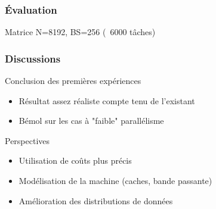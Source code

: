 \documentclass[xcolor={usenames,dvipsnames,svgnames,table}, aspectratio=43]{beamer}
\begin{document}
\begin{frame}
  \frametitle{Évaluation}
  Matrice N=8192, BS=256 (~6000 tâches)
  \begin{figure}
  \end{figure}


\end{frame}


\begin{frame}
  \frametitle{Discussions}

  \begin{block}{Conclusion des premières expériences}
    \begin{itemize}
      \item Résultat assez réaliste compte tenu de l'existant
      \item Bémol sur les cas à "faible" parallélisme
    \end{itemize}
  \end{block}
  \begin{block}{Perspectives}
    \begin{itemize}
      \item Utilisation de coûts plus précis
      \item Modélisation de la machine (caches, bande passante)
      \item Amélioration des distributions de données
    \end{itemize}
  \end{block}
\end{frame}
\end{document}
